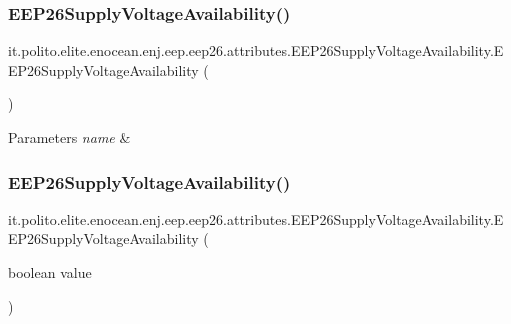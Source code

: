 \subsubsection{\texorpdfstring{E\+E\+P26\+Supply\+Voltage\+Availability()}{EEP26SupplyVoltageAvailability()}\hspace{0.1cm}{\footnotesize\ttfamily [1/2]}}
{\footnotesize\ttfamily it.\+polito.\+elite.\+enocean.\+enj.\+eep.\+eep26.\+attributes.\+E\+E\+P26\+Supply\+Voltage\+Availability.\+E\+E\+P26\+Supply\+Voltage\+Availability (\begin{DoxyParamCaption}{ }\end{DoxyParamCaption})}


\begin{DoxyParams}{Parameters}
{\em name} & \\
\hline
\end{DoxyParams}
\hypertarget{classit_1_1polito_1_1elite_1_1enocean_1_1enj_1_1eep_1_1eep26_1_1attributes_1_1_e_e_p26_supply_voltage_availability_a68a21cbd0e908ae4e4cd344a8dd7298d}{}\label{classit_1_1polito_1_1elite_1_1enocean_1_1enj_1_1eep_1_1eep26_1_1attributes_1_1_e_e_p26_supply_voltage_availability_a68a21cbd0e908ae4e4cd344a8dd7298d} 
\subsubsection{\texorpdfstring{E\+E\+P26\+Supply\+Voltage\+Availability()}{EEP26SupplyVoltageAvailability()}\hspace{0.1cm}{\footnotesize\ttfamily [2/2]}}
{\footnotesize\ttfamily it.\+polito.\+elite.\+enocean.\+enj.\+eep.\+eep26.\+attributes.\+E\+E\+P26\+Supply\+Voltage\+Availability.\+E\+E\+P26\+Supply\+Voltage\+Availability (\begin{DoxyParamCaption}\item[{boolean}]{value }\end{DoxyParamCaption})}



